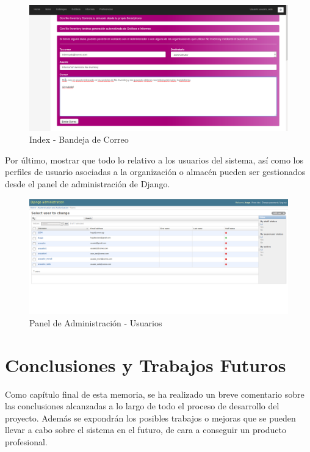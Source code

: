 \documentclass[a4paper,11pt]{book}
\begin{document}
\begin{figure}[H] 
\centering 
\includegraphics[scale=0.25]{imagenes/pruebas/correo.png}
\caption{ Index - Bandeja de Correo\cite{propio}}
\end{figure}

Por último, mostrar que todo lo relativo a los usuarios del sistema, así como los perfiles de usuario asociadas a la organización o almacén pueden ser gestionados desde el panel de administración de Django.  

\begin{figure}[H] 
\centering 
\includegraphics[scale=0.25]{imagenes/pruebas/admin.png}
\caption{ Panel de Administración - Usuarios\cite{propio}}
\end{figure}




\chapter{Conclusiones y Trabajos Futuros}

Como capítulo final de esta memoria, se ha realizado un breve comentario sobre las conclusiones alcanzadas a lo largo de todo el proceso de desarrollo del proyecto. Además se expondrán los posibles trabajos o mejoras que se pueden llevar a cabo sobre el sistema en el futuro, de cara a conseguir un producto profesional. 
\end{document}
